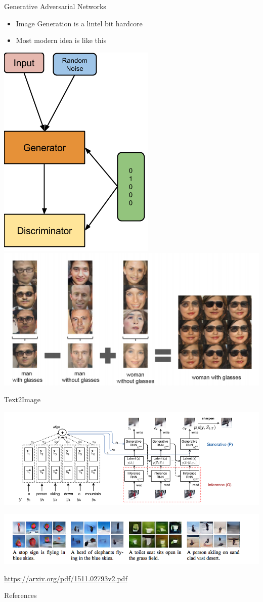 \documentclass{beamer}
\begin{document}
\begin{frame}{Generative Adversarial Networks}
	\begin{itemize}
		\item Image Generation is a lintel bit hardcore
		\item Most modern idea is like this
	\end{itemize}
	\begin{center}
		\includegraphics[scale=0.3]{img/gan2}
		\includegraphics[scale=0.4]{img/gan1}
	\end{center}
\end{frame}

\begin{frame}{Text2Image}
		\begin{center}
			\includegraphics[scale=0.3]{img/t2i}
			
			\includegraphics[scale=0.4]{img/t2ie.png}			
		\end{center}
	\url{https://arxiv.org/pdf/1511.02793v2.pdf}
\end{frame}

\begin{frame}{References}

\end{frame}
\end{document}
